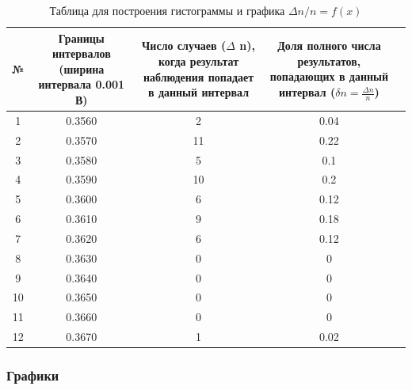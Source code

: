 \begin{center}
\begin{table}[h!]
\centering
\caption{Таблица для построения гистограммы и графика $\Delta n/n = f(x)$
}
\label{tabl:4}
\begin{tabular}{|c|c|c|c|c|}
\hline
\begin{minipage}{7mm}
    №
\end{minipage}&
\begin{minipage}{5cm}
    Границы интервалов (ширина интервала 0.001 В)
\end{minipage} &
\begin{minipage}{5cm}
    Число случаев ($\Delta$ n), когда результат наблюдения попадает в данный интервал
\end{minipage} &
\begin{minipage}{5cm}
    Доля полного числа результатов, попадающих в данный интервал ($\delta n = \frac{\Delta n}{n}$)
\end{minipage}\\
\hline
1 &	0.3560  &	2 & 0.04 \\
2 &	0.3570  &	11 & 0.22 \\
3 &	0.3580  &	5 & 0.1 \\
4 &	0.3590  &	10 & 0.2 \\
5 & 0.3600  &	6 & 0.12 \\
6 & 0.3610  &	9 & 0.18 \\
7 & 0.3620  &	6 & 0.12 \\
8 & 0.3630  &	0 & 0 \\
9 & 0.3640  &	0 & 0 \\
10& 0.3650  &	0 & 0 \\
11& 0.3660  &	0 & 0 \\
12& 0.3670  &	1 & 0.02 \\
\hline
\end{tabular}
\end{table}
\end{center}


\subsubsection{Графики}

